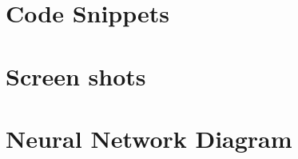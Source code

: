 \appendix


\section{ Code Snippets }
\section{ Screen shots }
\section{ Neural Network Diagram }
 

\newpage
